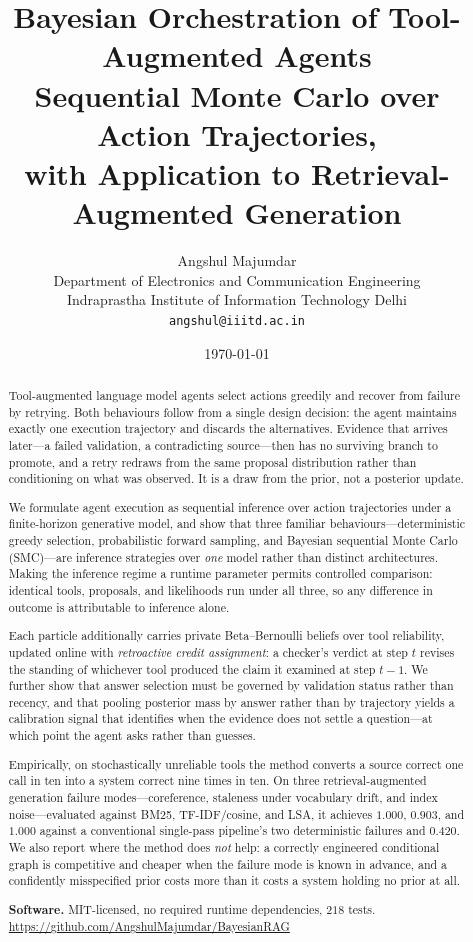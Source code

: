 \documentclass[11pt,a4paper]{article}
\title{\vspace{-2em}\textbf{Bayesian Orchestration of Tool-Augmented Agents}\\[0.4em]
\large Sequential Monte Carlo over Action Trajectories,\\ with Application to Retrieval-Augmented Generation}
\author{Angshul Majumdar\\
\small Department of Electronics and Communication Engineering\\
\small Indraprastha Institute of Information Technology Delhi\\
\small \texttt{angshul@iiitd.ac.in}}
\date{\today}
\begin{document}
\maketitle

\begin{abstract}
\noindent
Tool-augmented language model agents select actions greedily and recover from
failure by retrying. Both behaviours follow from a single design decision: the
agent maintains exactly one execution trajectory and discards the alternatives.
Evidence that arrives later---a failed validation, a contradicting
source---then has no surviving branch to promote, and a retry redraws from the
same proposal distribution rather than conditioning on what was observed. It is
a draw from the prior, not a posterior update.

We formulate agent execution as sequential inference over action trajectories
under a finite-horizon generative model, and show that three familiar
behaviours---deterministic greedy selection, probabilistic forward sampling,
and Bayesian sequential Monte Carlo (SMC)---are inference strategies over
\emph{one} model rather than distinct architectures. Making the inference
regime a runtime parameter permits controlled comparison: identical tools,
proposals, and likelihoods run under all three, so any difference in outcome is
attributable to inference alone.

Each particle additionally carries private Beta--Bernoulli beliefs over tool
reliability, updated online with \emph{retroactive credit assignment}: a
checker's verdict at step $t$ revises the standing of whichever tool produced
the claim it examined at step $t-1$. We further show that answer selection must
be governed by validation status rather than recency, and that pooling
posterior mass by answer rather than by trajectory yields a calibration signal
that identifies when the evidence does not settle a question---at which point
the agent asks rather than guesses.

Empirically, on stochastically unreliable tools the method converts a source
correct one call in ten into a system correct nine times in ten. On three
retrieval-augmented generation failure modes---coreference, staleness under
vocabulary drift, and index noise---evaluated against BM25, TF-IDF/cosine, and
LSA, it achieves $1.000$, $0.903$, and $1.000$ against a conventional
single-pass pipeline's two deterministic failures and $0.420$. We also report
where the method does \emph{not} help: a correctly engineered conditional graph
is competitive and cheaper when the failure mode is known in advance, and a
confidently misspecified prior costs more than it costs a system holding no
prior at all.

\vspace{0.5em}
\noindent\textbf{Software.} MIT-licensed, no required runtime dependencies,
$218$ tests. \url{https://github.com/AngshulMajumdar/BayesianRAG}
\end{abstract}
\end{document}

